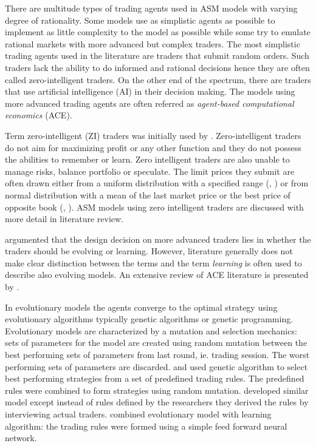 There are multitude types of trading agents used in ASM models with varying degree
of rationality. Some models use as simplistic agents as possible to implement as
little complexity to the model as possible while some try to emulate rational 
markets with more advanced but complex traders. The most simplistic trading agents
used in the literature are traders that submit random orders. Such traders
lack the ability to do informed and rational decisions hence they are often called
zero-intelligent traders. On the other end of the spectrum, there are traders
that use artificial intelligence (AI) in their decision making. The models using
more advanced trading agents are often referred as \emph{agent-based computational
economics} (ACE).

Term zero-intelligent (ZI) traders was initially used by \citet{God93}. Zero-intelligent
traders do not aim for maximizing profit or any other function and they do not 
possess the abilities to remember or learn. Zero intelligent traders are also unable
to manage risks, balance portfolio or speculate. The limit prices they submit are
often drawn either from a uniform distribution with a specified range (\citet{God93}, \citet{Mil08}) 
or from normal distribution with a mean of the last market price or the
best price of opposite book (\citet{Genoa01}, \citet{LIU20082535}). ASM models using
zero intelligent traders are discussed with more detail in literature review. 

\citet{LeBranon2000} argumented that the design decision on more advanced traders 
lies in whether the traders should be evolving or learning. However, literature
generally does not make clear distinction between the terms and the term \emph{learning}
is often used to describe also evolving models. An extensive review of ACE literature 
is presented by \citet{ACE12}.

In evolutionary models the agents converge to the optimal strategy using evolutionary algorithms typically
genetic algorithms or genetic programming. Evolutionary models are characterized by 
a mutation and selection mechanics: sets of parameters for the model are created 
using random mutation between the best performing sets of parameters from last 
round, ie. trading session. The worst performing sets of parameters are discarded.
\citet{GenAlgASM18} and \citet{GenAlgBTCASM19} used genetic algorithm to select 
best performing strategies from a set of predefined trading rules. The predefined
rules were combined to form strategies using random mutation. \citet{FieldGA05} developed
similar model except instead of rules defined by the researchers they derived the rules 
by interviewing actual traders. \citet{LeBranon2001} combined evolutionary model with 
learning algorithm: the trading rules were formed using a simple feed forward neural network.


